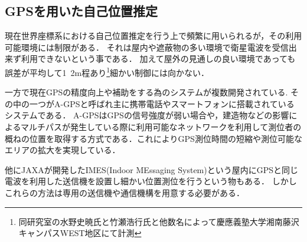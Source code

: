 \subsection{GPSを用いた自己位置推定}
現在世界座標系における自己位置推定を行う上で頻繁に用いられるが，その利用可能環境には制限がある．
それは屋内や遮蔽物の多い環境で衛星電波を受信出来ず利用できないという事である．
加えて屋外の見通しの良い環境であっても誤差が平均して1~2m程あり\footnote{同研究室の水野史暁氏と竹瀬浩行氏と他数名によって慶應義塾大学湘南藤沢キャンパスWEST地区にて計測}細かい制御には向かない．

一方で現在GPSの精度向上や補助をする為のシステムが複数開発されている.
その中の一つがA-GPS\cite{agps}と呼ばれ主に携帯電話やスマートフォンに搭載されているシステムである．
A-GPSはGPSの信号強度が弱い場合や，建造物などの影響によるマルチパスが発生している際に利用可能なネットワークを利用して測位者の概ねの位置を取得する方式である．これによりGPS測位時間の短縮や測位可能なエリアの拡大を実現している．

他にJAXAが開発したIMES(Indoor MEssaging System)\cite{imes}という屋内にGPSと同じ電波を利用した送信機を設置し細かい位置測位を行うという物もある．
しかしこれらの方法は専用の送信機や通信機構を用意する必要がある．